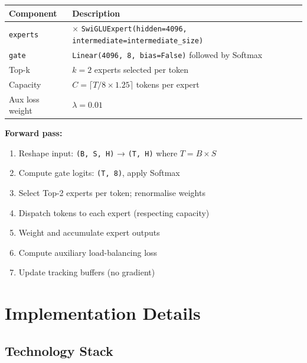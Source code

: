 \documentclass[11pt]{article}
\begin{document}
\begin{longtable}{|>{\raggedright\arraybackslash}p{}|>{\raggedright\arraybackslash}p{}|}
\hline
\textbf{Component} & \textbf{Description} \\ \hline
\texttt{experts} & 8 × \texttt{SwiGLUExpert(hidden=4096, intermediate=intermediate\_size)} \\ \hline
\texttt{gate} & \texttt{Linear(4096, 8, bias=False)} followed by Softmax \\ \hline
Top-k & $k = 2$ experts selected per token \\ \hline
Capacity & $C = \lceil T / 8 \times 1.25 \rceil$ tokens per expert \\ \hline
Aux loss weight & $\lambda = 0.01$ \\ \hline
\end{longtable}

\textbf{Forward pass:}

\begin{enumerate}[leftmargin=*]
\item Reshape input: \texttt{(B, S, H)} → \texttt{(T, H)} where $T = B \times S$
\item Compute gate logits: \texttt{(T, 8)}, apply Softmax
\item Select Top-2 experts per token; renormalise weights
\item Dispatch tokens to each expert (respecting capacity)
\item Weight and accumulate expert outputs
\item Compute auxiliary load-balancing loss
\item Update tracking buffers (no gradient)

\end{enumerate}

\section{Implementation Details}


\subsection{Technology Stack}
\end{document}
